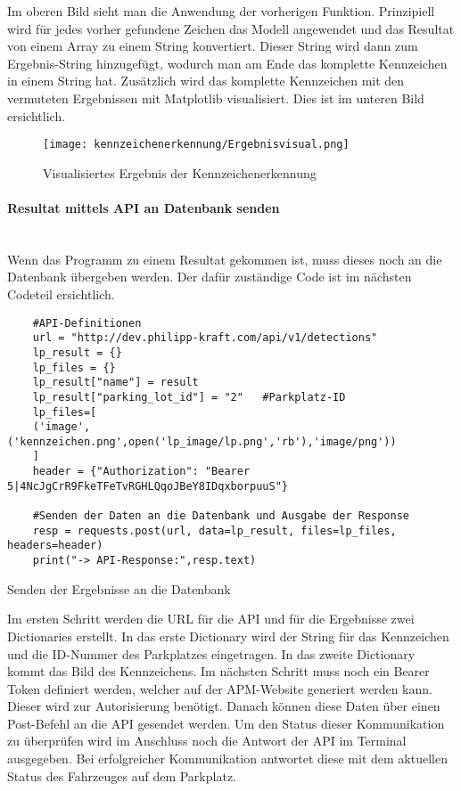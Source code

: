 Im oberen Bild sieht man die Anwendung der vorherigen Funktion. Prinzipiell wird für jedes vorher gefundene Zeichen das Modell angewendet 
und das Resultat von einem Array zu einem String konvertiert. Dieser String wird dann zum Ergebnis-String hinzugefügt, wodurch man am Ende das 
komplette Kennzeichen in einem String hat. Zusätzlich wird das komplette Kennzeichen mit den vermuteten Ergebnissen mit Matplotlib visualisiert. 
Dies ist im unteren Bild ersichtlich.

\begin{figure}[H]
    \centering
    \texttt{[image: kennzeichenerkennung/Ergebnisvisual.png]}
    \caption{Visualisiertes Ergebnis der Kennzeichenerkennung}
\end{figure}

\paragraph{Resultat mittels API an Datenbank senden}\mbox{}\\

Wenn das Programm zu einem Resultat gekommen ist, muss dieses noch an die Datenbank übergeben werden. Der dafür zuständige Code ist im nächsten Codeteil ersichtlich.

\begin{longlisting}
    \begin{verbatim}
    #API-Definitionen
    url = "http://dev.philipp-kraft.com/api/v1/detections"
    lp_result = {}
    lp_files = {}
    lp_result["name"] = result 
    lp_result["parking_lot_id"] = "2"   #Parkplatz-ID 
    lp_files=[
    ('image',('kennzeichen.png',open('lp_image/lp.png','rb'),'image/png'))
    ]
    header = {"Authorization": "Bearer 5|4NcJgCrR9FkeTFeTvRGHLQqoJBeY8IDqxborpuuS"}

    #Senden der Daten an die Datenbank und Ausgabe der Response
    resp = requests.post(url, data=lp_result, files=lp_files, headers=header)
    print("-> API-Response:",resp.text)
    \end{verbatim}
    \caption{Senden der Ergebnisse an die Datenbank}
\end{longlisting}

Im ersten Schritt werden die URL für die API und für die Ergebnisse zwei Dictionaries erstellt. In das erste Dictionary wird der String für das Kennzeichen 
und die ID-Nummer des Parkplatzes eingetragen. In das zweite Dictionary kommt das Bild des Kennzeichens. Im nächsten Schritt muss noch ein Bearer Token 
definiert werden, welcher auf der APM-Website generiert werden kann. Dieser wird zur Autorisierung benötigt. Danach können diese Daten über einen Post-Befehl 
an die API gesendet werden. Um den Status dieser Kommunikation zu überprüfen wird im Anschluss noch die Antwort der API im Terminal ausgegeben. Bei 
erfolgreicher Kommunikation antwortet diese mit dem aktuellen Status des Fahrzeuges auf dem Parkplatz.

